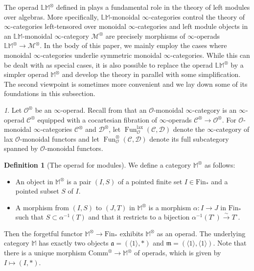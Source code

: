 \documentclass{amsart}
\theoremstyle{plain}
\theoremstyle{definition}
\newtheorem{definition}[theorem]{Definition}
\theoremstyle{remark}
\newtheorem{p}[theorem]{}
\numberwithin{equation}{theorem}
\newcommand{\mcal}[1]{\mathcal{#1}}
\newcommand{\mbb}[1]{\mathbb{#1}}
\newcommand{\mfk}[1]{\mathfrak{#1}}
\newcommand{\Comm}{\mathrm{Comm}}
\newcommand{\Fin}{\mathrm{Fin}}
\newcommand{\lax}{\mathrm{lax}}
\newcommand{\Fun}{\operatorname{Fun}}
\begin{document}
The operad $\mbb{LM}^\otimes$ defined in \cite{HA} plays a fundamental role in the theory of left modules over algebras.
More specifically, $\mbb{LM}$-monoidal $\infty$-categories control the theory of $\infty$-categories left-tensored over monoidal $\infty$-categories and left module objects in an $\mbb{LM}$-monoidal $\infty$-category $\mcal{M}^\otimes$ are precisely morphisms of $\infty$-operads $\mbb{LM}^\otimes\to\mcal{M}^\otimes$.
In the body of this paper, we mainly employ the cases where monoidal $\infty$-categories underlie symmetric monoidal $\infty$-categories.
While this can be dealt with as special cases, it is also possible to replace the operad $\mbb{LM}^\otimes$ by a simpler operad $\mbb{M}^\otimes$ and develop the theory in parallel with some simplification.
The second viewpoint is sometimes more convenient and we lay down some of its foundations in this subsection.

\begin{p}
Let $\mcal{O}^\otimes$ be an $\infty$-operad.
Recall from \cite{HA} that an $\mcal{O}$-monoidal $\infty$-category is an $\infty$-operad $\mcal{C}^\otimes$ equipped with a cocartesian fibration of $\infty$-operads $\mcal{C}^\otimes\to\mcal{O}^\otimes$.
For $\mcal{O}$-monoidal $\infty$-categories $\mcal{C}^\otimes$ and $\mcal{D}^\otimes$, let $\Fun^\lax_\mcal{O}(\mcal{C},\mcal{D})$ denote the $\infty$-category of lax $\mcal{O}$-monoidal functors and let $\Fun^\otimes_\mcal{O}(\mcal{C},\mcal{D})$ denote its full subcategory spanned by $\mcal{O}$-monoidal functors.
\end{p}

\begin{definition}[The operad for modules]\label{def:Mod}
We define a category $\mbb{M}^\otimes$ as follows:
\begin{itemize}[label={---},leftmargin=*]
\item An object in $\mbb{M}^\otimes$ is a pair $(I,S)$ of a pointed finite set $I\in\Fin_*$ and a pointed subset $S$ of $I$.
\item A morphism from $(I,S)$ to $(J,T)$ in $\mbb{M}^\otimes$ is a morphism $\alpha\colon I\to J$ in $\Fin_*$ such that $S\subset\alpha^{-1}(T)$ and that it restricts to a bijection $\alpha^{-1}(T^\circ)\xrightarrow{\sim}T^\circ$.
\end{itemize}
Then the forgetful functor $\mbb{M}^\otimes\to\Fin_*$ exhibits $\mbb{M}^\otimes$ as an operad.
The underlying category $\mbb{M}$ has exactly two objects $\mfk{a}=(\langle 1\rangle,*)$ and $\mfk{m}=(\langle 1\rangle,\langle 1\rangle)$.
Note that there is a unique morphism $\Comm^\otimes\to\mbb{M}^\otimes$ of operads, which is given by $I\mapsto(I,*)$.
\end{definition} 
\end{document}
